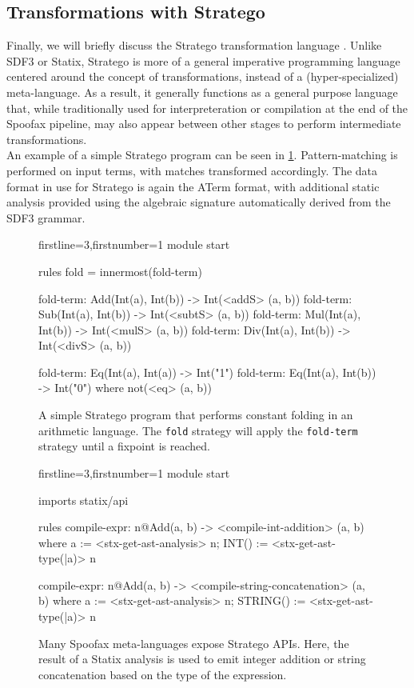 \subsection{Transformations with Stratego}
\label{sec:spoofax_transform}
Finally, we will briefly discuss the Stratego transformation language \cite{Visser05-SCAM}. Unlike SDF3 or Statix, Stratego is more of a general imperative programming language centered around the concept of transformations, instead of a (hyper-specialized) meta-language. As a result, it generally functions as a general purpose language that, while traditionally used for interpreteration or compilation at the end of the Spoofax pipeline, may also appear between other stages to perform intermediate transformations.\\

An example of a simple Stratego program can be seen in \cref{fig:str_example}. Pattern-matching is performed on input terms, with matches transformed accordingly. The data format in use for Stratego is again the \ac{ATerm} format, with additional static analysis provided using the algebraic signature automatically derived from the SDF3 grammar.\\

\begin{figure}
  \begin{stratego*}{firstline=3,firstnumber=1}
module start

rules
  fold = innermost(fold-term)

  fold-term: Add(Int(a), Int(b)) -> Int(<addS> (a, b))
  fold-term: Sub(Int(a), Int(b)) -> Int(<subtS> (a, b))
  fold-term: Mul(Int(a), Int(b)) -> Int(<mulS> (a, b))
  fold-term: Div(Int(a), Int(b)) -> Int(<divS> (a, b))

  fold-term: Eq(Int(a), Int(a)) -> Int("1")
  fold-term: Eq(Int(a), Int(b)) -> Int("0") where not(<eq> (a, b))
  \end{stratego*}
  \caption{A simple Stratego program that performs constant folding in an arithmetic language. The \texttt{fold} strategy will apply the \texttt{fold-term} strategy until a fixpoint is reached.}
  \label{fig:str_example}
\end{figure}

\begin{figure}
  \begin{stratego*}{firstline=3,firstnumber=1}
module start

imports
  statix/api

rules
  compile-expr: n@Add(a, b) -> <compile-int-addition> (a, b)
    where a := <stx-get-ast-analysis> n; INT() := <stx-get-ast-type(|a)> n
  
  compile-expr: n@Add(a, b) -> <compile-string-concatenation> (a, b)
    where a := <stx-get-ast-analysis> n; STRING() := <stx-get-ast-type(|a)> n
  \end{stratego*}
  \caption{Many Spoofax meta-languages expose Stratego APIs. Here, the result of a Statix analysis is used to emit integer addition or string concatenation based on the type of the expression.}
  \label{fig:str_stx_example}
\end{figure}

